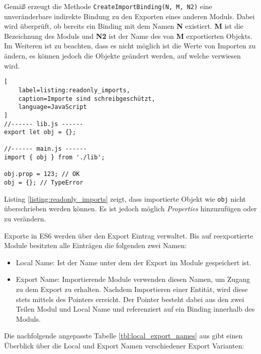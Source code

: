 Gemäß \textcite{ECMAScript} erzeugt die Methode \lstinline{CreateImportBinding(N, M, N2)} eine unveränderbare indirekte Bindung zu den Exporten eines anderen Moduls. Dabei wird überprüft, ob bereits ein Binding mit dem Namen \textbf{N} existiert. \textbf{M} ist die Bezeichnung des Moduls und \textbf{N2} ist der Name des von \textbf{M} exportierten Objekts.
Im Weiteren ist zu beachten, dass es nicht möglich ist die Werte von Importen zu ändern, es können jedoch die Objekte geändert werden, auf welche verwiesen wird. \autocite{Rauschmayer2018}

\begin{lstlisting}[
    label=listing:readonly_imports,
    caption=Importe sind schreibgeschützt,
	language=JavaScript
]
//------ lib.js ------
export let obj = {};

//------ main.js ------
import { obj } from './lib';

obj.prop = 123; // OK
obj = {}; // TypeError
\end{lstlisting}

Listing \ref{listing:readonly_imports} zeigt, dass importierte Objekt wie \lstinline{obj} nicht überschrieben werden können. Es ist jedoch möglich \textit{Properties} hinzuzufügen oder zu verändern.

Exporte in ES6 werden über den Export Eintrag verwaltet. Bis auf reexportierte Module besitzten alle Einträgen die folgenden zwei Namen: 

\begin{itemize}
\item Local Name: Ist der Name unter dem der Export im Module gespeichert ist.
\item Export Name: Importierende Module verwenden diesen Namen, um Zugang zu dem Export zu erhalten. Nachdem Importieren einer Entität, wird diese stets mittels des Pointers erreicht. Der Pointer besteht dabei aus den zwei Teilen Modul und Local Name und referenziert auf ein Binding innerhalb des Moduls.
\end{itemize}
\autocite{Rauschmayer2018}

Die nachfolgende angepasste Tabelle \ref{tbl:local_export_names} aus \textcite{ECMAScript} gibt einen Überblick über die Local und Export Namen verschiedener Export Varianten:

